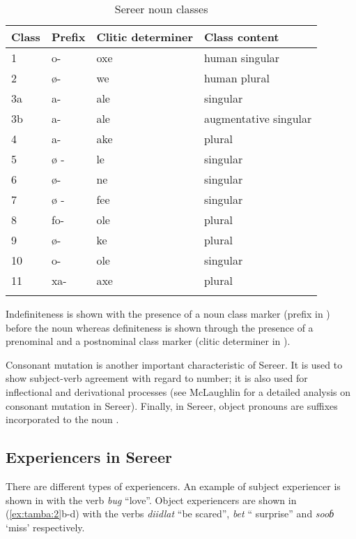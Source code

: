 \documentclass[output=paper]{langscibook}
\begin{document}
\begin{table}
\caption{\label{tab:tamba:1}Sereer noun classes}

\begin{tabular}{llll}
\lsptoprule 
Class & Prefix & Clitic determiner & Class content\\\midrule
1 & o- & oxe & human singular\\
2 & ø{}- & we & human plural\\
3a & a- & ale & singular\\
3b & a- & ale & augmentative singular\\
4 & a- & ake & plural\\
5 & ø - & le & singular\\
6 & ø- & ne & singular\\
7 & ø - & fee & singular\\
8 & fo- & ole & plural\\
9 & ø- & ke & plural\\
10 & o- & ole & singular\\
11 & xa- & axe & plural\\
\lspbottomrule
\end{tabular}
\end{table}


  Indefiniteness is shown with the presence of a noun class marker (prefix in ) before the noun whereas definiteness is shown through the presence of a prenominal and a postnominal class marker (clitic determiner in ). 

  Consonant mutation is another important characteristic of Sereer. It is used to show subject-verb  agreement with regard to number; it is also used for inflectional and derivational processes (see McLaughlin for a detailed analysis on consonant mutation in Sereer). Finally, in Sereer, object pronouns are suffixes incorporated to the noun \citep{BaierTA}.

\subsection{Experiencers in Sereer}

There are different types of experiencers. An example of subject experiencer is shown in  with the verb \textit{bug} “love”. Object experiencers are shown in (\ref{ex:tamba:2}b-d) with the verbs \textit{diidlat} “be scared”, \textit{bet} “ surprise” and \textit{sooɓ}  ‘miss’  respectively.
\end{document}
